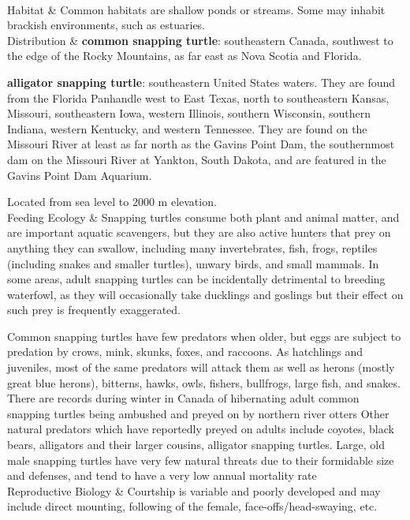 \begin{center}
\begin{longtabu}
\begin{itemize}[noitemsep]
	\end{itemize}
	\\
	\hline
	Habitat & 
	Common habitats are shallow ponds or streams. Some may inhabit brackish environments, such as estuaries. 
	\\
	\hline
	Distribution & 
	\textbf{common snapping turtle}: southeastern Canada, southwest to the edge of the Rocky Mountains, as far east as Nova Scotia and Florida.
	
	\textbf{alligator snapping turtle}: southeastern United States waters. They are found from the Florida Panhandle west to East Texas, north to southeastern Kansas, Missouri, southeastern Iowa, western Illinois, southern Wisconsin, southern Indiana, western Kentucky, and western Tennessee. They are found on the Missouri River at least as far north as the Gavins Point Dam, the southernmost dam on the Missouri River at Yankton, South Dakota, and are featured in the Gavins Point Dam Aquarium.
	
	Located from sea level to 2000 m elevation.
	\\
	\hline
	Feeding Ecology & 
	Snapping turtles consume both plant and animal matter, and are important aquatic scavengers, but they are also active hunters that prey on anything they can swallow, including many invertebrates, fish, frogs, reptiles (including snakes and smaller turtles), unwary birds, and small mammals. In some areas, adult snapping turtles can be incidentally detrimental to breeding waterfowl, as they will occasionally take ducklings and goslings but their effect on such prey is frequently exaggerated.
	
	Common snapping turtles have few predators when older, but eggs are subject to predation by crows, mink, skunks, foxes, and raccoons. As hatchlings and juveniles, most of the same predators will attack them as well as herons (mostly great blue herons), bitterns, hawks, owls, fishers, bullfrogs, large fish, and snakes. There are records during winter in Canada of hibernating adult common snapping turtles being ambushed and preyed on by northern river otters Other natural predators which have reportedly preyed on adults include coyotes, black bears, alligators and their larger cousins, alligator snapping turtles. Large, old male snapping turtles have very few natural threats due to their formidable size and defenses, and tend to have a very low annual mortality rate
	\\
	\hline
	Reproductive Biology & 
	 Courtship is variable and poorly developed and may include direct mounting, following of the female, face-offs/head-swaying, etc.
	 

\end{longtabu}
\end{center}
